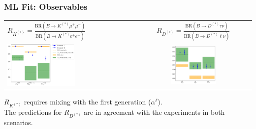 \documentclass[mathserif, 10pt]{beamer}
\begin{document}
\begin{frame}\frametitle{ML Fit: Observables}

    \begin{center}
        \begin{tabular}{lc}
            $R_{K^{(*)}} = \frac{\mathrm{BR}(B\to K^{(*)}\mu^+ \mu^-)}{\mathrm{BR}(B\to K^{(*)}e^+ e^-)}$ & $R_{D^{(*)}} = \frac{\mathrm{BR}(B\to D^{(*)}\tau \nu)}{\mathrm{BR}(B\to D^{(*)}\ell \nu)}$ \\
            \includegraphics[width=0.55\textwidth]{figures/rotRKplot.pdf}                                 &
            \includegraphics[width=0.4\textwidth]{figures/rotRDplot.pdf}
        \end{tabular}
    \end{center}
$R_{K^{(*)}}$ requires mixing with the first generation ($\alpha^\ell$).\\
The predictions for $R_{D^{(*)}}$ are in agreement with the experiments in both scenarios.

\end{frame}
\end{document}
